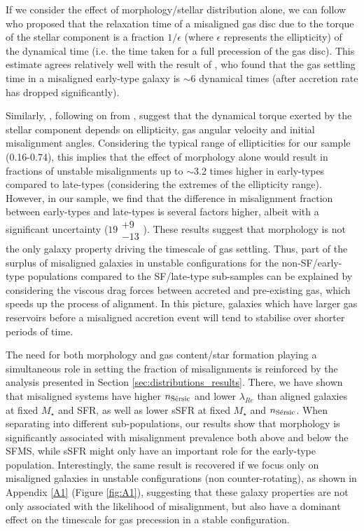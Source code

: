 \documentclass[fleqn,usenatbib]{mnras}
\begin{document}
If we consider the effect of morphology/stellar distribution alone, we can follow \cite{LakeNorman1983} who proposed that the relaxation time of a misaligned gas disc due to the torque of the stellar component is a fraction $1/\epsilon$ (where $\epsilon$ represents the ellipticity) of the dynamical time (i.e. the time taken for a full precession of the gas disc). This estimate agrees relatively well with the result of \cite{Freekevdv2015}, who found that the gas settling time in a misaligned early-type galaxy is $\sim 6$ dynamical times (after accretion rate has dropped significantly).

Similarly, \cite{Bryant2019}, following on from \citet{Tohline1982}, suggest that the dynamical torque exerted by the stellar component depends on ellipticity, gas angular velocity and initial misalignment angles. 
Considering the typical range of ellipticities for our sample (0.16-0.74), this implies that the effect of morphology alone would result in fractions of unstable misalignments up to $\sim$3.2 times higher in early-types compared to late-types (considering the extremes of the ellipticity range). However, in our sample, we find that the difference in misalignment fraction between early-types and late-types is several factors higher, albeit with a significant uncertainty ($ 19 \substack{+9 \\ -13}$). These results suggest that morphology is not the only galaxy property driving the timescale of gas settling.
Thus, part of the surplus of misaligned galaxies in unstable configurations for the non-SF/early-type populations compared to the SF/late-type sub-samples can be explained by considering the viscous drag forces between accreted and pre-existing gas, which speeds up the process of alignment. In this picture, galaxies which have larger gas reservoirs before a misaligned accretion event will tend to stabilise over shorter periods of time. 

The need for both morphology and gas content/star formation playing a simultaneous role in setting the fraction of misalignments is reinforced by the analysis presented in Section \ref{sec:distributions_results}. There, we have shown that misaligned systems have higher $n_{\rm{S\Acute{e}rsic}}$ and lower $\lambda_{Re}$ than aligned galaxies at fixed $M_{\star}$ and SFR, as well as lower sSFR at fixed $M_{\star}$ and $n_{\rm{S\Acute{e}rsic}}$. When separating into different sub-populations, our results show that morphology is significantly associated with misalignment prevalence both above and below the SFMS, while sSFR might only have an important role for the early-type population.
Interestingly, the same result is recovered if we focus only on misaligned galaxies in unstable configurations (non counter-rotating), as shown in Appendix \ref{A1} (Figure \ref{fig:A1}), suggesting that these galaxy properties are not only associated with the likelihood of misalignment, but also have a dominant effect on the timescale for gas precession in a stable configuration.
\end{document}
